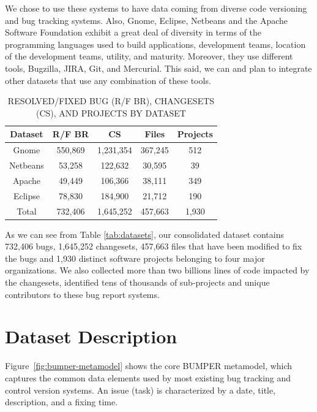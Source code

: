 \documentclass{sig-alternate-05-2015}
\begin{document}
We chose to use these systems to have data coming from
diverse code versioning and bug tracking systems.
Also, Gnome, Eclipse, Netbeans and the Apache Software Foundation exhibit a
great deal of diversity in terms of the programming
languages used to build applications, development teams,
location of the development teams, utility, and maturity.
Moreover, they use different tools, Bugzilla, JIRA, Git, and
Mercurial. This said, we can and plan to integrate other datasets that
use any combination of these tools.

\begin{table}[]
\centering
\caption{
RESOLVED/FIXED BUG (R/F BR),  CHANGESETS (CS), AND
PROJECTS BY DATASET \label{tab:datasets}}
\label{tab:summary}
\begin{tabular}{c|c|c|c|c}
\textbf{Dataset} & \textbf{R/F BR} & \textbf{CS} & \textbf{Files} & \textbf{Projects} \\ \hline \hline
Gnome            & 550,869         & 1,231,354   & 367,245        & 512                \\ \hline
Netbeans         & 53,258          & 122,632     & 30,595         & 39                \\ \hline
Apache           & 49,449          & 106,366     & 38,111         & 349               \\ \hline
Eclipse          & 78,830          & 184,900     & 21,712         & 190                \\ \hline \hline
Total            & 732,406         & 1,645,252   & 457,663        & 1,930               \\ \hline \hline
\end{tabular}
\end{table}

As we can see from Table \ref{tab:datasets}, our consolidated dataset contains 732,406 bugs,
1,645,252 changesets, 457,663 files that have been modified to fix the bugs
and 1,930 distinct software projects belonging to four major organizations.
We also collected more than two billions lines of code impacted by the
changesets, identified tens of thousands of sub-projects and unique contributors
to these bug report systems.



\section{Dataset Description}
\label{sec:Dataset Description}

Figure~\ref{fig:bumper-metamodel}  shows the core BUMPER metamodel,
which captures the common data elements used by most existing
bug tracking and control version systems. An issue (task) is
characterized by a date, title, description, and a fixing time.
\end{document}
